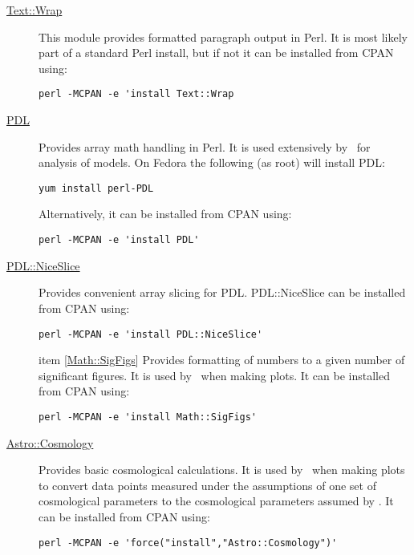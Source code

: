 \begin{description}
\item [\href{http://search.cpan.org/~jhi/perl-5.8.0/lib/Text/Wrap.pm}{{\normalfont \ttfamily Text::Wrap}}] This module provides formatted paragraph output in Perl. It is most likely part of a standard Perl install, but if not it can be installed from CPAN using:
\begin{verbatim}
perl -MCPAN -e 'install Text::Wrap
\end{verbatim}
\item [\href{http://pdl.perl.org/}{{\normalfont \ttfamily PDL}}] Provides array math handling in Perl. It is used extensively by \glc\ for analysis of models. On Fedora the following (as root) will install {\normalfont \ttfamily PDL}:
\begin{verbatim}
yum install perl-PDL
\end{verbatim}
Alternatively, it can be installed from CPAN using:
\begin{verbatim}
perl -MCPAN -e 'install PDL'
\end{verbatim}

\item [\href{http://search.cpan.org/dist/PDL-NiceSlice/NiceSlice.pm}{{\normalfont \ttfamily PDL::NiceSlice}}] Provides convenient array slicing for PDL. {\normalfont \ttfamily PDL::NiceSlice} can be installed from CPAN using:
\begin{verbatim}
perl -MCPAN -e 'install PDL::NiceSlice'
\end{verbatim}

item [\href{http://search.cpan.org/~sbeck/Math-SigFigs-1.09/lib/Math/SigFigs.pod}{{\normalfont \ttfamily Math::SigFigs}}] Provides formatting of numbers to a given number of significant figures. It is used by \glc\ when making plots. It can be installed from CPAN using:
\begin{verbatim}
perl -MCPAN -e 'install Math::SigFigs'
\end{verbatim}

\item [\href{http://search.cpan.org/~djburke/Astro-Cosmology-0.90/Cosmology.pm}{{\normalfont \ttfamily Astro::Cosmology}}] Provides basic cosmological calculations. It is used by \glc\ when making plots to convert data points measured under the assumptions of one set of cosmological parameters to the cosmological parameters assumed by \glc. It can be installed from CPAN using:
\begin{verbatim}
perl -MCPAN -e 'force("install","Astro::Cosmology")'
\end{verbatim}
\end{description}

